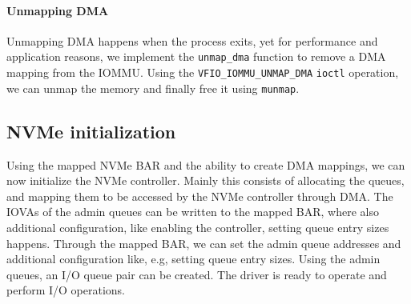 \paragraph{Unmapping DMA}
Unmapping DMA happens when the process exits, yet for performance and application reasons, we implement the \texttt{unmap\_dma} function to remove a DMA mapping from the IOMMU. Using the \texttt{VFIO\_IOMMU\_UNMAP\_DMA} \texttt{ioctl} operation, we can unmap the memory and finally free it using \texttt{munmap}.


\subsection{NVMe initialization}\label{sec:nvmeinit}
Using the mapped NVMe BAR and the ability to create DMA mappings, we can now initialize the NVMe controller. Mainly this consists of allocating the queues, and mapping them to be accessed by the NVMe controller through DMA. The IOVAs of the admin queues can be written to the mapped BAR, where also additional configuration, like enabling the controller, setting queue entry sizes happens. Through the mapped BAR, we can set the admin queue addresses and additional configuration like, e.g, setting queue entry sizes. Using the admin queues, an I/O queue pair can be created. The driver is ready to operate and perform I/O operations.

